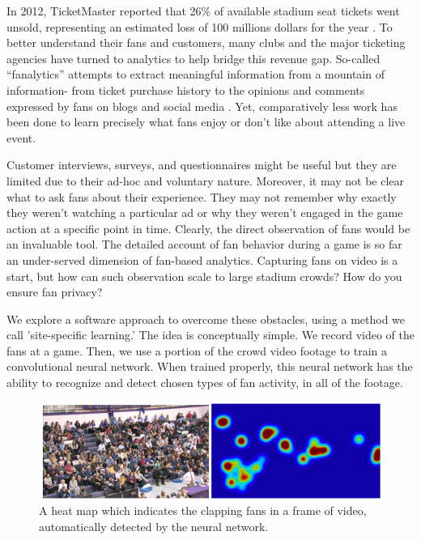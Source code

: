 \documentclass[times, 10pt,twocolumn]{article}
\begin{document}

In 2012, TicketMaster reported that 26\% of available stadium seat tickets went unsold, representing an estimated loss of 100 millions dollars for the year \cite{ticketmaster}.  To better understand their fans and customers, many clubs and the major ticketing agencies have turned to analytics to help bridge this revenue gap.  So-called ``fanalytics'' attempts to extract meaningful information from a mountain of information- from ticket purchase history to the opinions and comments expressed by fans on blogs and social media  \cite{fanalytics}.  Yet, comparatively less work has been done to learn precisely what fans enjoy or don't like about attending a live event.   

Customer interviews, surveys, and questionnaires might be useful but they are limited due to their ad-hoc and voluntary nature.  Moreover, it may not be clear what to ask fans about their experience.  They may not remember why exactly they weren't watching a particular ad or why they weren't engaged in the game action at a specific point in time.  Clearly, the direct observation of fans would be an invaluable tool.  The detailed account of fan behavior during a game is so far an under-served dimension of fan-based analytics.  Capturing fans on video is a start, but how can such observation scale to large stadium crowds?  How do you ensure fan privacy?     

We explore a software approach to overcome these obstacles, using a method we call 'site-specific learning.'  The idea is conceptually simple.  We record video of the fans at a game.  Then, we use a portion of the crowd video footage to train a convolutional neural network.  When trained properly, this neural network has the ability to recognize and detect chosen types of fan activity, in all of the footage.  

\begin{figure}[bt]
\centering
\includegraphics[width=0.96\columnwidth]{fanheat}
\caption{\label{fig_fanheat} \small A heat map which indicates the clapping fans in a frame of video, automatically detected by the neural network. }
\end{figure}
\end{document}
